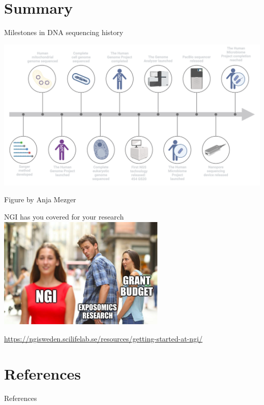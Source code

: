 \documentclass[10pt]{beamer}
\newcommand{\creditdark}[1]{{\vspace{\fill} \par \raggedleft \scriptsize \mdseries \color{scMGray} #1 \par}}
\begin{document}

\section{Summary}


\begin{frame}[standout]{Milestones in DNA sequencing history}
	\vspace*{-1.1cm}
	\begin{center}
		\hspace*{-1.1cm}
		\includegraphics[width=1.2\textwidth]{./figures/timeline.png}
	\end{center}
	\creditdark{Figure by Anja Mezger}
\end{frame}

\begin{frame}[standout]{NGI has you covered for your research}
	\includegraphics[width=0.6\textwidth]{./figures/ngi-meme2.jpg} \par
	\href{https://ngisweden.scilifelab.se/resources/getting-started-at-ngi/}{https://ngisweden.scilifelab.se/resources/getting-started-at-ngi/}
\end{frame}


\section{References}


\begin{frame}[allowframebreaks]{References}
\begingroup
\renewcommand*{\bibfont}{\footnotesize} 
\printbibliography[heading=none]
\endgroup
\end{frame}
\end{document}

